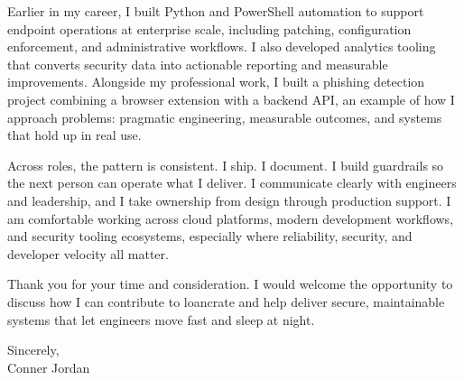 \documentclass[letterpaper,11pt]{article}
\begin{document}
\vspace{16pt}

Earlier in my career, I built Python and PowerShell automation to support endpoint operations at enterprise scale, including patching, configuration enforcement, and administrative workflows. I also developed analytics tooling that converts security data into actionable reporting and measurable improvements. Alongside my professional work, I built a phishing detection project combining a browser extension with a backend API, an example of how I approach problems: pragmatic engineering, measurable outcomes, and systems that hold up in real use.

\vspace{16pt}

Across roles, the pattern is consistent. I ship. I document. I build guardrails so the next person can operate what I deliver. I communicate clearly with engineers and leadership, and I take ownership from design through production support. I am comfortable working across cloud platforms, modern development workflows, and security tooling ecosystems, especially where reliability, security, and developer velocity all matter.

\vspace{16pt}

Thank you for your time and consideration. I would welcome the opportunity to discuss how I can contribute to loancrate and help deliver secure, maintainable systems that let engineers move fast and sleep at night.

\vspace{16pt}

Sincerely,\\
Conner Jordan
\end{document}
